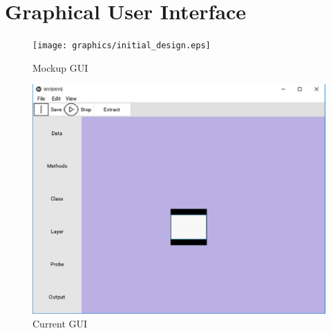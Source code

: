 \documentclass[journal,10pt,onecolumn,compsoc]{IEEEtran} \usepackage[margin=1.0in]{geometry} \usepackage{pdfpages}
\begin{document}
\section{Graphical User Interface}
\begin{figure}[H]
\texttt{[image: graphics/initial\_design.eps]}
\caption{Mockup GUI}
\end{figure}
\begin{figure}[H]
\includegraphics[width=\textwidth]{graphics/current_design.eps}
\caption{Current GUI}
\end{figure}
\end{document}
